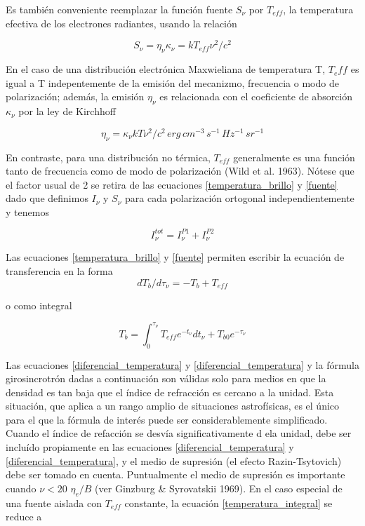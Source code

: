 Es tambi\'en conveniente reemplazar la funci\'on fuente $S_\nu$ por $T_{eff}$, la temperatura efectiva de los electrones radiantes, usando la relaci\'on

\begin{equation} \label{fuente}
S_\nu = \eta_\nu \kappa_\nu = kT_{eff}\nu^2/c^2
\end{equation}

En el caso de una distribuci\'on electr\'onica Maxwieliana de temperatura T, $T_eff$ es igual a T indepentemente de la emisi\'on del mecanizmo, frecuencia o modo de polarizaci\'on; adem\'as, la emisi\'on $\eta_\nu$ es relacionada con el coeficiente de absorci\'on $\kappa_\nu$ por la ley de Kirchhoff

\begin{equation} \label{eta_frecuencia}
\eta_\nu = \kappa_\nu k T \nu^2/c^2 \, erg \, cm^{-3} \,s^{-1} \,Hz^{-1}\, sr^{-1}
\end{equation}

En contraste, para una distribuci\'on no t\'ermica, $T_{eff}$ generalmente es una funci\'on tanto de frecuencia como de modo de polarizaci\'on (Wild et al. 1963). N\'otese que el factor usual de 2 se retira de las ecuaciones \ref{temperatura_brillo} y \ref{fuente} dado que definimos $I_\nu$ y $S_\nu$ para cada polarizaci\'on ortogonal independientemente y tenemos

\begin{equation} \label{intensidad_total}
I^{tot}_\nu = I^{P1}_\nu + I^{P2}_\nu
\end{equation}

Las ecuaciones \ref{temperatura_brillo} y \ref{fuente} permiten escribir la ecuaci\'on de transferencia en la forma
\begin{equation} \label{diferencial_temperatura}
dT_b/d\tau_\nu = -T_b + T_{eff}
\end{equation}

o como integral

\begin{equation} \label{temperatura_integral}
T_b = \int_{0}^{\tau_\nu} T_{eff} e^{-t_\nu} dt_\nu + T_{b0} e^{-\tau_\nu}
\end{equation}

Las ecuaciones \ref{diferencial_temperatura} y \ref{diferencial_temperatura} y la f\'ormula girosincrotr\'on dadas a continuaci\'on son v\'alidas solo para medios en que la densidad es tan baja que el \'indice de refracci\'on es cercano a la unidad. Esta situaci\'on, que aplica a un rango amplio de situaciones astrof\'isicas, es el \'unico para el que la f\'ormula de inter\'es puede ser considerablemente simplificado. Cuando el \'indice de refacci\'on se desv\'ia significativamente d ela unidad, debe ser inclu\'ido propiamente en las ecuaciones \ref{diferencial_temperatura} y \ref{diferencial_temperatura}, y el medio de supresi\'on (el efecto Razin-Tsytovich) debe ser tomado en cuenta. Puntualmente el medio de supresi\'on es importante cuando $\nu < 20$ $\eta_e/B$ (ver Ginzburg \& Syrovatskii 1969).
En el caso especial de una fuente aislada con $T_{eff}$ constante, la ecuaci\'on \ref{temperatura_integral} se reduce a

